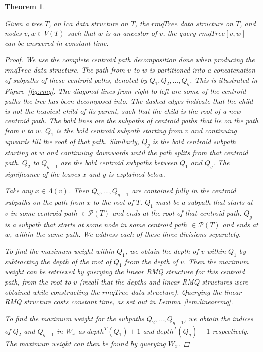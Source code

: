 \documentclass{article}
\newcommand{\leafset}{\Lambda}
\newtheorem{rmqquery}[incompatibility]{Theorem}
\begin{document}
    \medskip
    \begin{rmqquery}
        \label{lem:rmqquery}

        Given a tree $T$, an $lca$ data structure on $T$, the $rmqTree$ data structure on $T$, and nodes $v, w \in V(T)$ such that $w$ is an ancestor of $v$, the query $rmqTree[v, w]$ can be answered in constant time.

        \begin{proof}
            We use the complete centroid path decomposition done when producing the $rmqTree$ data structure. The path from $v$ to $w$ is partitioned into a concatenation of subpaths of these centroid paths, denoted by $Q_1, Q_2, ..., Q_g$. This is illustrated in Figure~\ref{fig:rmq}. The diagonal lines from right to left are some of the centroid paths the tree has been decomposed into. The dashed edges indicate that the child is not the heaviest child of its parent, such that the child is the root of a new centroid path. The bold lines are the subpaths of centroid paths that lie on the path from $v$ to $w$. $Q_1$ is the bold centroid subpath starting from $v$ and continuing upwards till the root of that path. Similarly, $Q_g$ is the bold centroid subpath starting at $w$ and continuing downwards until the path splits from that centroid path. $Q_2$ to $Q_{g - 1}$ are the bold centroid subpaths between $Q_1$ and $Q_g$. The significance of the leaves $x$ and $y$ is explained below.

            Take any $x \in \leafset(v)$. Then $Q_2, ..., Q_{g - 1}$ are contained fully in the centroid subpaths on the path from $x$ to the root of $T$. $Q_1$ must be a subpath that starts at $v$ in some centroid path $\in \mathcal{P}(T)$ and ends at the root of that centroid path. $Q_g$ is a subpath that starts at some node in some centroid path $\in \mathcal{P}(T)$ and ends at $w$, within the same path. We address each of these three divisions separately.

            To find the maximum weight within $Q_1$, we obtain the depth of $v$ within $Q_1$ by subtracting the depth of the root of $Q_1$ from the depth of $v$. Then the maximum weight can be retrieved by querying the linear RMQ structure for this centroid path, from the root to $v$ (recall that the depths and linear RMQ structures were obtained while constructing the $rmqTree$ data structure). Querying the linear RMQ structure costs constant time, as set out in Lemma~\ref{lem:linearrmq}.

            To find the maximum weight for the subpaths $Q_2, ..., Q_{g - 1}$, we obtain the indices of $Q_2$ and $Q_{g-1}$ in $W_x$ as $depth^{T}(Q_1) + 1$ and $depth^{T}(Q_g) - 1$ respectively. The maximum weight can then be found by querying $W_x$.


\end{proof}
\end{rmqquery}
\end{document}
